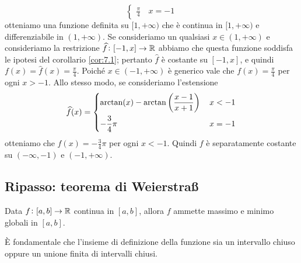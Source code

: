 \begin{remark}
\[\begin{cases}
        \frac{\pi}{4}\, & x=-1
    \end{cases}
    \]
    otteniamo una funzione definita su $[1,+\infty)$ che è continua in $[1, +\infty)$ e differenziabile in $(1, +\infty)$. Se consideriamo un qualsiasi $x\in(1,+\infty)$ e consideriamo la restrizione $\widehat{f}\colon [-1, x]\to \amsbb{R}$ abbiamo che questa funzione soddisfa le ipotesi del corollario \ref{cor:7.1}; pertanto $\widehat{f}$ è costante su $[-1, x]$, e quindi $f(x) = \widehat{f}(x) = \frac{\pi}{4}$. Poiché $x\in(-1, +\infty)$ è generico vale che $f(x) = \frac{\pi}{4}$ per ogni $x>-1$. Allo stesso modo, se consideriamo l'estensione
    \[
    \widehat{f}(x) = \begin{dcases}
        \arctan(x)-\arctan\left(\frac{x-1}{x+1}\right)\, & x<-1\\
        -\frac{3}{4}\pi\, & x=-1
    \end{dcases}
    \]
    otteniamo che $f(x)=-\frac{3}{4}\pi$ per ogni $x<-1$. Quindi $f$ è separatamente costante su $(-\infty, -1)$ e $(-1, +\infty)$.
\end{remark}
\subsection{Ripasso: teorema di \texorpdfstring{Weierstra{\ss}}{Weierstraß}}
\begin{theorem}
    \label{th:7.3}
    Data $f\colon[a,b]\to \amsbb{R}$ continua in $[a,b]$, allora $f$ ammette massimo e minimo globali in $[a,b]$.
\end{theorem}
\begin{remark}
    \`E fondamentale che l'insieme di definizione della funzione sia un intervallo chiuso oppure un unione finita di intervalli chiusi.
\end{remark}
